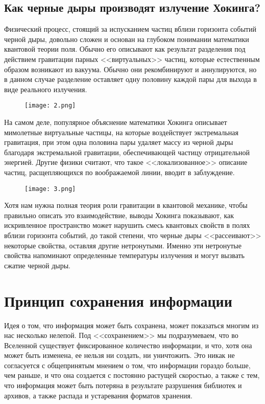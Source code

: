 \documentclass[bachelor, och, referat]{SCWorks}
\begin{document}
\subsection{Как черные дыры производят излучение Хокинга?}

Физический процесс, стоящий за испусканием частиц вблизи горизонта событий черной дыры, довольно сложен и основан на глубоком понимании математики квантовой теории поля. Обычно его описывают как результат разделения под действием гравитации парных <<виртуальных>> частиц, которые естественным образом возникают из вакуума. Обычно они рекомбинируют и аннулируются, но в данном случае разделение оставляет одну половину каждой пары для выхода в виде реального излучения.

\begin{figure}[h!]
    \centering
    \texttt{[image: 2.png]}
\end{figure}

На самом деле, популярное объяснение математики Хокинга описывает мимолетные виртуальные частицы, на которые воздействует экстремальная гравитация, при этом одна половина пары удаляет массу из черной дыры благодаря экстремальной гравитации, обеспечивающей частицу отрицательной энергией. Другие физики считают, что такое <<локализованное>> описание частиц, расщепляющихся по воображаемой линии, вводит в заблуждение.

\begin{figure}[h!]
    \centering
    \texttt{[image: 3.png]}
\end{figure}

Хотя нам нужна полная теория роли гравитации в квантовой механике, чтобы правильно описать это взаимодействие, выводы Хокинга показывают, как искривленное пространство может нарушить смесь квантовых свойств в полях вблизи горизонта событий, до такой степени, что черные дыры <<рассеивают>> некоторые свойства, оставляя другие нетронутыми. Именно эти нетронутые свойства напоминают определенные температуры излучения и могут вызвать сжатие черной дыры.

\section{Принцип сохранения информации}

Идея о том, что информация может быть сохранена, может показаться многим из нас несколько нелепой. Под <<сохранением>> мы подразумеваем, что во Вселенной существует фиксированное количество информации, и что, хотя она может быть изменена, ее нельзя ни создать, ни уничтожить. Это никак не согласуется с общепринятым мнением о том, что информации гораздо больше, чем раньше, и что она создается с постоянно растущей скоростью, а также с тем, что информация может быть потеряна в результате разрушения библиотек и архивов, а также распада и устаревания форматов хранения.
\end{document}
